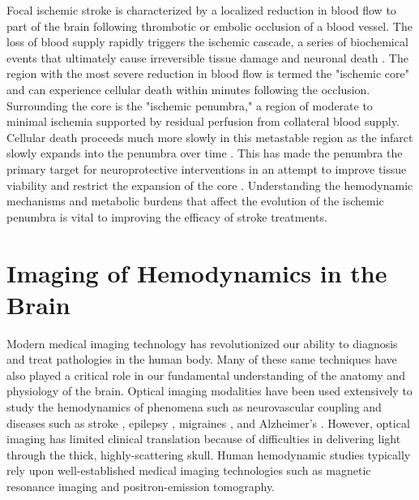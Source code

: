 Focal ischemic stroke is characterized by a localized reduction in blood flow to part of the brain following thrombotic or embolic occlusion of a blood vessel. The loss of blood supply rapidly triggers the ischemic cascade, a series of biochemical events that ultimately cause irreversible tissue damage and neuronal death \cite{Nesto:1987dx}. The region with the most severe reduction in blood flow is termed the "ischemic core" and can experience cellular death within minutes following the occlusion. Surrounding the core is the "ischemic penumbra," a region of moderate to minimal ischemia supported by residual perfusion from collateral blood supply. Cellular death proceeds much more slowly in this metastable region as the infarct slowly expands into the penumbra over time \cite{Heiss:1992ge, Ginsberg:1999jy}. This has made the penumbra the primary target for neuroprotective interventions in an attempt to improve tissue viability and restrict the expansion of the core \cite{Felberg:2000gu, RamosCabrer:2011gz}. Understanding the hemodynamic mechanisms and metabolic burdens that affect the evolution of the ischemic penumbra is vital to improving the efficacy of stroke treatments.



\section{Imaging of Hemodynamics in the Brain}

Modern medical imaging technology has revolutionized our ability to diagnosis and treat pathologies in the human body. Many of these same techniques have also played a critical role in our fundamental understanding of the anatomy and physiology of the brain. Optical imaging modalities have been used extensively \cite{Hillman:2007ep} to study the hemodynamics of phenomena such as neurovascular coupling \cite{Liao:2013jl} and diseases such as stroke \cite{Obrig:2011hy}, epilepsy \cite{Bahar:2006es}, migraines \cite{Bolay:2002jg}, and Alzheimer's \cite{KoronyoHamaoui:2011hk}. However, optical imaging has limited clinical translation because of difficulties in delivering light through the thick, highly-scattering skull. Human hemodynamic studies typically rely upon well-established medical imaging technologies such as magnetic resonance imaging and positron-emission tomography.

